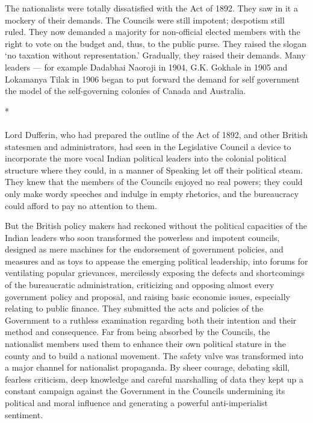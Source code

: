 The nationalists were totally dissatisfied with the Act of 1892. They saw in it a mockery of their demands. The Councils were still impotent; despotism still ruled. They now demanded a majority for non-official elected members with the right to vote on the budget and, thus, to the public purse. They raised the slogan `no taxation without representation.' Gradually, they raised their demands. Many leaders --- for example Dadabhai Naoroji in 1904, G.K. Gokhale in 1905 and Lokamanya Tilak in 1906 began to put forward the demand for self government the model of the self-governing colonies of Canada and Australia.

\begin{center}*\end{center}

\paragraph*{}

Lord Dufferin, who had prepared the outline of the Act of 1892, and other British statesmen and administrators, had seen in the Legislative Council a device to incorporate the more vocal Indian political leaders into the colonial political structure where they could, in a manner of Speaking let off their political steam. They knew that the members of the Councils enjoyed no real powers; they could only make wordy speeches and indulge in empty rhetorics, and the bureaucracy could afford to pay no attention to them.

But the British policy makers had reckoned without the political capacities of the Indian leaders who soon transformed the powerless and impotent councils, designed as mere machines for the endorsement of government policies, and measures and as toys to appease the emerging political leadership, into forums for ventilating popular grievances, mercilessly exposing the defects and shortcomings of the bureaucratic administration, criticizing and opposing almost every government policy and proposal, and raising basic economic issues, especially relating to public finance. They submitted the acts and policies of the Government to a ruthless examination regarding both their intention and their method and consequence. Far from being absorbed by the Councils, the nationalist members used them to enhance their own political stature in the county and to build a national movement. The safety valve was transformed into a major channel for nationalist propaganda. By sheer courage, debating skill, fearless criticism, deep knowledge and careful marshalling of data they kept up a constant campaign against the Government in the Councils undermining its political and moral influence and generating a powerful anti-imperialist sentiment.

